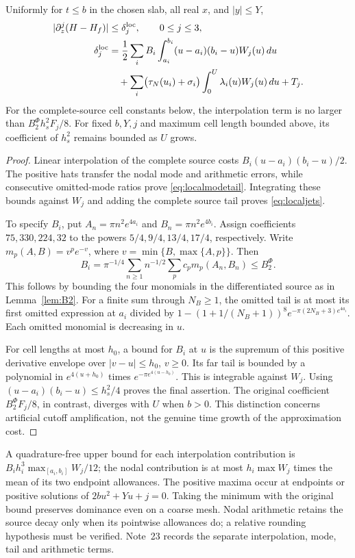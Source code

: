 \begin{proposition}\label{prop:localjets}
Uniformly for $t\le b$ in the chosen slab, all real $x$, and $|y|\le Y$,
\begin{align}
 |\partial_z^j(H-H_f)|&\le\delta_j^{\rm loc},\qquad 0\le j\le3,\notag\\
 \delta_j^{\rm loc}
 &=\frac12\sum_i B_i\int_{a_i}^{b_i}(u-a_i)(b_i-u)W_j(u)\,du\notag\\
 &\quad+\sum_i\bigl(\tau_N(u_i)+\sigma_i\bigr)
                \int_0^U\lambda_i(u)W_j(u)\,du+T_j.
 \label{eq:localjets}
\end{align}
For the complete-source cell constants below, the interpolation term is
no larger than $B_2^{\Phi}h_s^2F_j/8$. For fixed $b,Y,j$ and maximum cell length
bounded above, its coefficient of $h_s^2$ remains bounded as $U$ grows.
\end{proposition}
\begin{proof}
Linear interpolation of the complete source costs
$B_i(u-a_i)(b_i-u)/2$. The positive hats transfer the nodal mode and
arithmetic errors, while consecutive omitted-mode ratios prove
\eqref{eq:localmodetail}. Integrating these bounds against $W_j$ and
adding the complete source tail proves \eqref{eq:localjets}.

To specify $B_i$, put $A_n=\pi n^2e^{4a_i}$ and $B_n=\pi n^2e^{4b_i}$.
Assign coefficients $75,330,224,32$ to the powers $5/4,9/4,13/4,17/4$,
respectively. Write $m_p(A,B)=v^pe^{-v}$, where
$v=\min\{B,\max\{A,p\}\}$. Then
\[
 B_i=\pi^{-1/4}\sum_{n\ge1}n^{-1/2}\sum_p c_p m_p(A_n,B_n)
 \le B_2^{\Phi}.
\]
This follows by bounding the four monomials in the differentiated
source as in Lemma~\ref{lem:B2}. For a finite sum through $N_B\ge1$,
the omitted tail is at most its first omitted expression at $a_i$
divided by
$1-(1+1/(N_B+1))^8e^{-\pi(2N_B+3)e^{4a_i}}$.
Each omitted monomial is decreasing in $u$.

For cell lengths at most $h_0$, a bound for $B_i$ at $u$ is the
supremum of this positive derivative envelope over
$|v-u|\le h_0$, $v\ge0$. Its far tail is bounded by a polynomial in
$e^{4(u+h_0)}$ times $e^{-\pi e^{4(u-h_0)}}$. This is integrable
against $W_j$. Using $(u-a_i)(b_i-u)\le h_s^2/4$ proves the final
assertion. The original coefficient $B_2^{\Phi}F_j/8$, in contrast, diverges
with $U$ when $b>0$. This distinction concerns artificial cutoff
amplification, not the genuine time growth of the approximation cost.
\end{proof}
A quadrature-free upper bound for each interpolation contribution is
$B_i h_i^3\max_{[a_i,b_i]}W_j/12$; the nodal contribution is at most
$h_i\max W_j$ times the mean of its two endpoint allowances.
The positive maxima occur at endpoints or positive solutions of
$2bu^2+Yu+j=0$. Taking the minimum with the original bound preserves
dominance even on a coarse mesh. Nodal arithmetic retains the source
decay only when its pointwise allowances do; a relative rounding
hypothesis must be verified. Note~23 \cite{n23} records the separate
interpolation, mode, tail and arithmetic terms.

